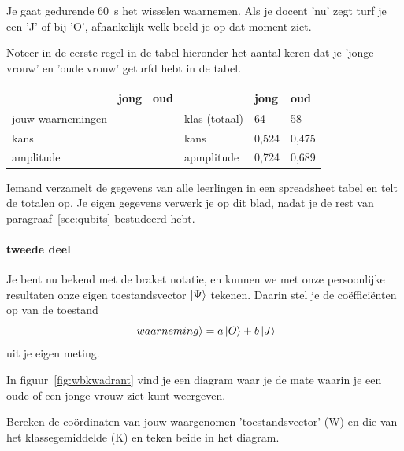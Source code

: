 \documentclass[../../main.tex]{subfiles}
\begin{document}
Je gaat gedurende \SI{60}{\second} het wisselen waarnemen. Als je docent 
'nu' zegt turf je een 'J' of bij 'O', afhankelijk welk beeld je op dat moment ziet. 

Noteer in de eerste regel in de tabel hieronder het aantal keren dat je 'jonge vrouw' en 'oude vrouw' geturfd hebt  in de tabel.

\begin{tabular}{l|l|l||l|l|l}
                  & jong & oud &                 & jong & oud \\ \hline
jouw waarnemingen &      &     & klas (totaal)   &  64  & 58    \\ \hline
kans              &      &     & kans            &   0,524 & 0,475 \\ \hline
amplitude     &      &     & apmplitude  &   0,724 & 0,689
      
\end{tabular}

\vspace{.5cm}
Iemand verzamelt de gegevens van alle leerlingen in een spreadsheet tabel en telt de totalen op. Je eigen gegevens verwerk je op dit blad, nadat je de rest van paragraaf~\ref{sec:qubits} bestudeerd hebt.


\paragraph{tweede deel} Je bent nu bekend met de braket notatie, en kunnen we met onze persoonlijke resultaten onze eigen toestandsvector $\ket{\Psi}$ tekenen. 
 Daarin stel je de co\"effici\"enten op van de toestand \[\ket{waarneming}=a\ket{O}+b\ket{J}\] uit je eigen meting.

In figuur~\ref{fig:wbkwadrant} vind je een diagram waar je de mate waarin je een oude of een jonge vrouw ziet kunt weergeven.


Bereken de co\"ordinaten van jouw  waargenomen 'toestandsvector' (W) en die van het klassegemiddelde (K) en teken beide in het diagram. 
\end{document}
